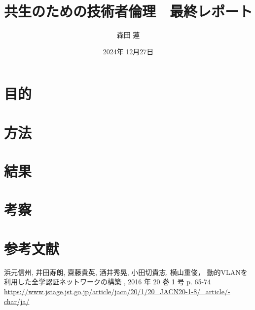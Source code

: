 \documentclass{jlreq}
\title{共生のための技術者倫理　最終レポート}
\author{森田 蓮}
\date{2024年 12月27日}
\begin{document}
\maketitle

\section{目的}


\section{方法}



\section{結果}



\section{考察}



\section*{参考文献}
浜元信州, 井田寿朗, 齋藤貴英, 酒井秀晃, 小田切貴志, 横山重俊，
動的VLANを利用した全学認証ネットワークの構築  
, 2016 年 20 巻 1 号 p. 65-74  
\url{https://www.jstage.jst.go.jp/article/jacn/20/1/20_JACN20-1-8/_article/-char/ja/}
\end{document}
